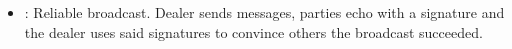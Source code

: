 
\begin{itemize}
	\setlength\itemsep{6pt}
	
	\item \cite{CCS:Reiter94}: Reliable broadcast. Dealer sends messages, parties echo with a signature and the dealer uses said signatures to convince others the broadcast succeeded.
\end{itemize}